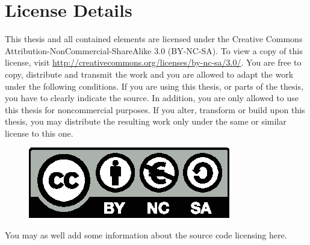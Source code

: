 \chapter*{License Details}
\thispagestyle{empty}

This thesis and all contained elements are licensed under the Creative Commons
Attribution-NonCommercial-ShareAlike 3.0 (BY-NC-SA). To view a copy of this
license, visit \url{http://creativecommons.org/licenses/by-nc-sa/3.0/}.  You
are free to copy, distribute and transmit the work and you are allowed to adapt
the work under the following conditions. If you are using this thesis, or parts
of the thesis, you have to clearly indicate the source. In addition, you are
only allowed to use this thesis for noncommercial purposes. If you alter,
transform or build upon this thesis, you may distribute the resulting work only
under the same or similar license to this one.

\begin{figure}[b]
    \raggedleft
    \includegraphics[scale=0.7]{img/by-nc-sa-eu.eps}
\end{figure}

You may as well add some information about the source code licensing
here.

\cleardoublepage
